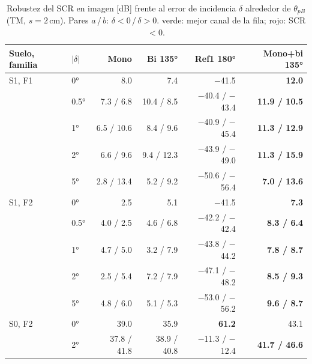 \begin{table}[H]
\centering\small
\caption{Robustez del SCR en imagen [dB] frente al error de incidencia $\delta$ alrededor de $\theta_{pB}$ (TM, $s=2$\,cm). Pares $a$\,/\,$b$: $\delta<0$\,/\,$\delta>0$. \colorbox{mejor}{verde}: mejor canal de la fila; \colorbox{peor}{rojo}: SCR $<0$.}
\label{tab:C_err_scr}
\begin{tabular}{@{}llrrrr@{}}
\toprule
Suelo, familia & $|\delta|$ & Mono & Bi 135° & Ref1 180° & Mono+bi 135° \\
\midrule
S1, F1 & 0° & 8.0 & 7.4 & \cellcolor{peor}$-$41.5 & \cellcolor{mejor}\textbf{12.0} \\
 & 0.5° & 7.3 / 6.8 & 10.4 / 8.5 & \cellcolor{peor}$-$40.4 / $-$43.4 & \cellcolor{mejor}\textbf{11.9 / 10.5} \\
 & 1° & 6.5 / 10.6 & 8.4 / 9.6 & \cellcolor{peor}$-$40.9 / $-$45.4 & \cellcolor{mejor}\textbf{11.3 / 12.9} \\
 & 2° & 6.6 / 9.6 & 9.4 / 12.3 & \cellcolor{peor}$-$43.9 / $-$49.0 & \cellcolor{mejor}\textbf{11.3 / 15.9} \\
 & 5° & 2.8 / 13.4 & 5.2 / 9.2 & \cellcolor{peor}$-$50.6 / $-$56.4 & \cellcolor{mejor}\textbf{7.0 / 13.6} \\
\midrule
S1, F2 & 0° & 2.5 & 5.1 & \cellcolor{peor}$-$41.5 & \cellcolor{mejor}\textbf{7.3} \\
 & 0.5° & 4.0 / 2.5 & 4.6 / 6.8 & \cellcolor{peor}$-$42.2 / $-$42.4 & \cellcolor{mejor}\textbf{8.3 / 6.4} \\
 & 1° & 4.7 / 5.0 & 3.2 / 7.9 & \cellcolor{peor}$-$43.8 / $-$44.2 & \cellcolor{mejor}\textbf{7.8 / 8.7} \\
 & 2° & 2.5 / 5.4 & 7.2 / 7.9 & \cellcolor{peor}$-$47.1 / $-$48.2 & \cellcolor{mejor}\textbf{8.5 / 9.3} \\
 & 5° & 4.8 / 6.0 & 5.1 / 5.3 & \cellcolor{peor}$-$53.0 / $-$56.2 & \cellcolor{mejor}\textbf{9.6 / 8.7} \\
\midrule
S0, F2 & 0° & 39.0 & 35.9 & \cellcolor{mejor}\textbf{61.2} & 43.1 \\
 & 2° & 37.8 / 41.8 & 38.9 / 40.8 & \cellcolor{peor}$-$11.3 / $-$12.4 & \cellcolor{mejor}\textbf{41.7 / 46.6} \\
\bottomrule
\end{tabular}
\end{table}
